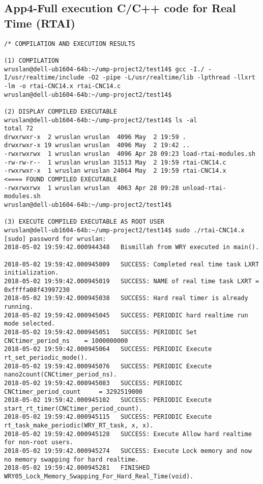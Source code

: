 \subsection{App4-Full execution C/C++ code for Real Time (RTAI)}
\begin{lstlisting}[caption={App4-Full execution C/C++ code for Real Time (RTAI)}, label=App4-Full execution C/C++ code for Real Time (RTAI)]
/* COMPILATION AND EXECUTION RESULTS

(1) COMPILATION
wruslan@dell-ub1604-64b:~/ump-project2/test14$ gcc -I./ -I/usr/realtime/include -O2 -pipe -L/usr/realtime/lib -lpthread -llxrt -lm -o rtai-CNC14.x rtai-CNC14.c
wruslan@dell-ub1604-64b:~/ump-project2/test14$

(2) DISPLAY COMPILED EXECUTABLE 
wruslan@dell-ub1604-64b:~/ump-project2/test14$ ls -al
total 72
drwxrwxr-x  2 wruslan wruslan  4096 May  2 19:59 .
drwxrwxr-x 19 wruslan wruslan  4096 May  2 19:42 ..
-rwxrwxrwx  1 wruslan wruslan  4096 Apr 28 09:23 load-rtai-modules.sh
-rw-rw-r--  1 wruslan wruslan 31513 May  2 19:59 rtai-CNC14.c
-rwxrwxr-x  1 wruslan wruslan 24064 May  2 19:59 rtai-CNC14.x           <==== FOUND COMPILED EXECUTABLE
-rwxrwxrwx  1 wruslan wruslan  4063 Apr 28 09:28 unload-rtai-modules.sh
wruslan@dell-ub1604-64b:~/ump-project2/test14$

(3) EXECUTE COMPILED EXECUTABLE AS ROOT USER
wruslan@dell-ub1604-64b:~/ump-project2/test14$ sudo ./rtai-CNC14.x 
[sudo] password for wruslan: 
2018-05-02 19:59:42.000944348 	Bismillah from WRY executed in main().

2018-05-02 19:59:42.000945009 	SUCCESS: Completed real time task LXRT initialization.
2018-05-02 19:59:42.000945019 	SUCCESS: NAME of real time task LXRT = 0xffffa08f43997230
2018-05-02 19:59:42.000945038 	SUCCESS: Hard real timer is already running.
2018-05-02 19:59:42.000945045 	SUCCESS: PERIODIC hard realtime run mode selected.
2018-05-02 19:59:42.000945051 	SUCCESS: PERIODIC Set CNCtimer_period_ns 	= 1000000000 
2018-05-02 19:59:42.000945064 	SUCCESS: PERIODIC Execute rt_set_periodic_mode().
2018-05-02 19:59:42.000945076 	SUCCESS: PERIODIC Execute nano2count(CNCtimer_period_ns).
2018-05-02 19:59:42.000945083 	SUCCESS: PERIODIC CNCtimer_period_count 	= 3292519000 
2018-05-02 19:59:42.000945102 	SUCCESS: PERIODIC Execute start_rt_timer(CNCtimer_period_count).
2018-05-02 19:59:42.000945115 	SUCCESS: PERIODIC Execute rt_task_make_periodic(WRY_RT_task, x, x).
2018-05-02 19:59:42.000945128 	SUCCESS: Execute Allow hard realtime for non-root users.
2018-05-02 19:59:42.000945274 	SUCCESS: Execute Lock memory and now no memory swapping for hard realtime.
2018-05-02 19:59:42.000945281 	FINISHED WRY05_Lock_Memory_Swapping_For_Hard_Real_Time(void).


\end{lstlisting}
